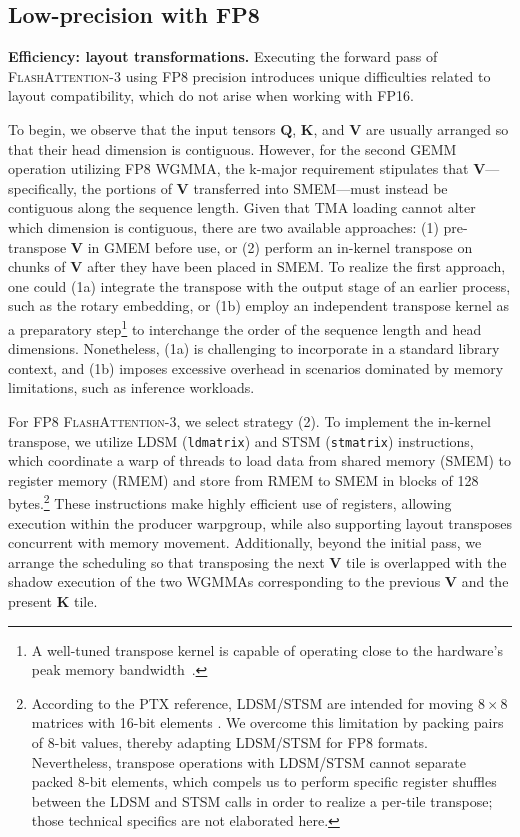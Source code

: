 \subsection{Low-precision with FP8}
\label{sec:algofp8}

\textbf{Efficiency: layout transformations.} Executing the forward pass of \textsc{FlashAttention-3} using FP8 precision introduces unique difficulties related to layout compatibility, which do not arise when working with FP16.

To begin, we observe that the input tensors $\mathbf{Q}$, $\mathbf{K}$, and $\mathbf{V}$ are usually arranged so that their head dimension is contiguous. However, for the second GEMM operation utilizing FP8 WGMMA, the k-major requirement stipulates that $\mathbf{V}$—specifically, the portions of $\mathbf{V}$ transferred into SMEM—must instead be contiguous along the sequence length. Given that TMA loading cannot alter which dimension is contiguous, there are two available approaches: (1) pre-transpose $\mathbf{V}$ in GMEM before use, or (2) perform an in-kernel transpose on chunks of $\mathbf{V}$ after they have been placed in SMEM. To realize the first approach, one could (1a) integrate the transpose with the output stage of an earlier process, such as the rotary embedding, or (1b) employ an independent transpose kernel as a preparatory step\footnote{A well-tuned transpose kernel is capable of operating close to the hardware’s peak memory bandwidth~\citep{colfax_cutlass_transpose_2024}.} to interchange the order of the sequence length and head dimensions. Nonetheless, (1a) is challenging to incorporate in a standard library context, and (1b) imposes excessive overhead in scenarios dominated by memory limitations, such as inference workloads.

For FP8 \textsc{FlashAttention-3}, we select strategy (2). To implement the in-kernel transpose, we utilize LDSM (\verb|ldmatrix|) and STSM (\verb|stmatrix|) instructions, which coordinate a warp of threads to load data from shared memory (SMEM) to register memory (RMEM) and store from RMEM to SMEM in blocks of 128 bytes.\footnote{According to the PTX reference, LDSM/STSM are intended for moving $8 \times 8$ matrices with 16-bit elements \cite[\S 9.7.13.4.15-16]{ptx}. We overcome this limitation by packing pairs of 8-bit values, thereby adapting LDSM/STSM for FP8 formats. Nevertheless, transpose operations with LDSM/STSM cannot separate packed 8-bit elements, which compels us to perform specific register shuffles between the LDSM and STSM calls in order to realize a per-tile transpose; those technical specifics are not elaborated here.} These instructions make highly efficient use of registers, allowing execution within the producer warpgroup, while also supporting layout transposes concurrent with memory movement. Additionally, beyond the initial pass, we arrange the scheduling so that transposing the next $\mathbf{V}$ tile is overlapped with the shadow execution of the two WGMMAs corresponding to the previous $\mathbf{V}$ and the present $\mathbf{K}$ tile.


